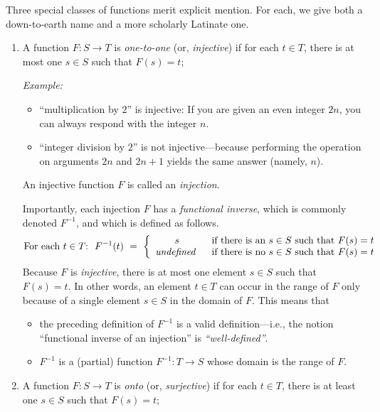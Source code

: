Three special classes of functions merit explicit mention.  For each,
we give both a down-to-earth name and a more scholarly Latinate one.
\begin{enumerate}
\item
A function $F: S \rightarrow T$ is {\it one-to-one} (or, {\it
  injective}) if for each $t \in T$, there is at most one $s \in S$
such that $F(s) = t$;

\medskip

{\em Example:}
\begin{itemize}
\item
 ``multiplication by $2$'' is injective: If you are given an even
  integer $2n$, you can always respond with the integer $n$.
\item
``integer division by $2$'' is not injective---because performing the
  operation on arguments $2n$ and $2n+1$ yields the same answer
  (namely, $n$).
\end{itemize}

An injective function $F$ is called an {\it injection}.

\smallskip

Importantly, each injection $F$ has a {\it functional inverse},
%
which is commonly denoted $F^{-1}$,
%
and which is defined as follows.
\[
\mbox{For each $t \in T$:} \ \
F^{-1}(t) \ = \ \left\{
\begin{array}{cl}
s &
\mbox{ if there is an $s \in S$ such that $F(s) = t$} \\
\mbox{\it undefined } &
\mbox{ if there is no $s \in S$ such that $F(s) = t$}
\end{array}
\right.
\]
Because $F$ is {\em injective}, there is at most one element $s \in S$ such that
$F(s)= t$.  In other words, an element $t \in T$ can occur in the
range of $F$ only because of a single element $s \in S$ in the domain
of $F$.  This means that
\begin{itemize}
\item
the preceding definition of $F^{-1}$ is a valid definition---i.e., the
notion ``functional inverse of an injection'' is {\it
  ``well-defined''}.
\item
$F^{-1}$ is a (partial) function $F^{-1}: T \rightarrow S$ whose
  domain is the range of $F$.
\end{itemize}

\item
A function $F: S \rightarrow T$ is {\it onto} (or, {\it surjective}) if
for each $t \in T$, there is at least one $s \in S$ such that $F(s) =
t$;


\end{enumerate}
